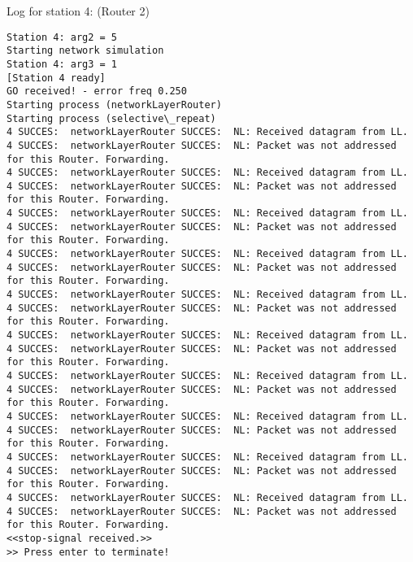 Log for station 4: (Router 2)
\begin{lstlisting}[breaklines=true]
Station 4: arg2 = 5
Starting network simulation
Station 4: arg3 = 1
[Station 4 ready]
GO received! - error freq 0.250
Starting process (networkLayerRouter)
Starting process (selective\_repeat)
4 SUCCES:  networkLayerRouter SUCCES:  NL: Received datagram from LL.
4 SUCCES:  networkLayerRouter SUCCES:  NL: Packet was not addressed for this Router. Forwarding.
4 SUCCES:  networkLayerRouter SUCCES:  NL: Received datagram from LL.
4 SUCCES:  networkLayerRouter SUCCES:  NL: Packet was not addressed for this Router. Forwarding.
4 SUCCES:  networkLayerRouter SUCCES:  NL: Received datagram from LL.
4 SUCCES:  networkLayerRouter SUCCES:  NL: Packet was not addressed for this Router. Forwarding.
4 SUCCES:  networkLayerRouter SUCCES:  NL: Received datagram from LL.
4 SUCCES:  networkLayerRouter SUCCES:  NL: Packet was not addressed for this Router. Forwarding.
4 SUCCES:  networkLayerRouter SUCCES:  NL: Received datagram from LL.
4 SUCCES:  networkLayerRouter SUCCES:  NL: Packet was not addressed for this Router. Forwarding.
4 SUCCES:  networkLayerRouter SUCCES:  NL: Received datagram from LL.
4 SUCCES:  networkLayerRouter SUCCES:  NL: Packet was not addressed for this Router. Forwarding.
4 SUCCES:  networkLayerRouter SUCCES:  NL: Received datagram from LL.
4 SUCCES:  networkLayerRouter SUCCES:  NL: Packet was not addressed for this Router. Forwarding.
4 SUCCES:  networkLayerRouter SUCCES:  NL: Received datagram from LL.
4 SUCCES:  networkLayerRouter SUCCES:  NL: Packet was not addressed for this Router. Forwarding.
4 SUCCES:  networkLayerRouter SUCCES:  NL: Received datagram from LL.
4 SUCCES:  networkLayerRouter SUCCES:  NL: Packet was not addressed for this Router. Forwarding.
4 SUCCES:  networkLayerRouter SUCCES:  NL: Received datagram from LL.
4 SUCCES:  networkLayerRouter SUCCES:  NL: Packet was not addressed for this Router. Forwarding.
<<stop-signal received.>>
>> Press enter to terminate!
\end{lstlisting}

